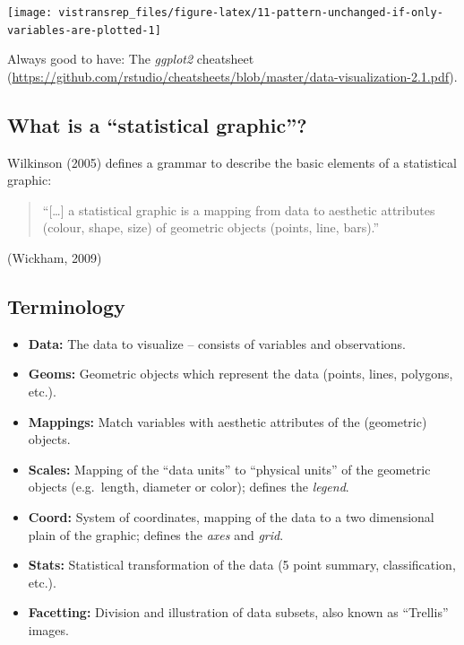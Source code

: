 \documentclass[]{book}
\begin{document}
\begin{flushright}\texttt{[image: vistransrep\_files/figure-latex/11-pattern-unchanged-if-only-variables-are-plotted-1]} \end{flushright}

Always good to have: The \emph{ggplot2} cheatsheet (\url{https://github.com/rstudio/cheatsheets/blob/master/data-visualization-2.1.pdf}).

\hypertarget{what-is-a-statistical-graphic}{%
\subsection{What is a ``statistical graphic''?}\label{what-is-a-statistical-graphic}}

Wilkinson (2005) defines a grammar to describe the basic elements of a
statistical graphic:

\begin{quote}
``{[}\ldots{}{]} a statistical graphic is a mapping from data to
aesthetic attributes (colour, shape, size) of geometric objects
(points, line, bars).''
\end{quote}

\hfill (Wickham, 2009)

\hypertarget{terminology}{%
\subsection{Terminology}\label{terminology}}

\begin{itemize}
\item
  \textbf{Data:} The data to visualize -- consists of variables and observations.
\item
  \textbf{Geoms:} Geometric objects which represent the data (points, lines, polygons, etc.).
\item
  \textbf{Mappings:} Match variables with aesthetic attributes of the (geometric) objects.
\item
  \textbf{Scales:} Mapping of the ``data units'' to ``physical units'' of the geometric objects (e.g.~length, diameter or color); defines the \emph{legend}.
\item
  \textbf{Coord:} System of coordinates, mapping of the data to a two dimensional plain of the graphic; defines the \emph{axes} and \emph{grid}.
\item
  \textbf{Stats:} Statistical transformation of the data (5 point summary, classification, etc.).
\item
  \textbf{Facetting:} Division and illustration of data subsets, also known as ``Trellis'' images.
\end{itemize}
\end{document}
